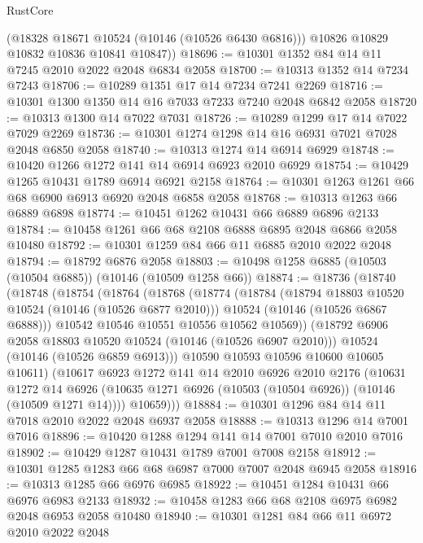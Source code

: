 \begin{lexlean}{RustCore}
\begin{coremodule}
        (@18328 @18671 @10524 (@10146 (@10526 @6430 @6816)))
        @10826
        @10829
        @10832
        @10836
        @10841
        @10847))
@18696 := @10301 @1352 @84 @14 @11 @7245 @2010 @2022 @2048 @6834 @2058
@18700 := @10313 @1352 @14 @7234 @7243
@18706 := @10289 @1351 @17 @14 @7234 @7241 @2269
@18716 := @10301 @1300 @1350 @14 @16 @7033 @7233 @7240 @2048 @6842 @2058
@18720 := @10313 @1300 @14 @7022 @7031
@18726 := @10289 @1299 @17 @14 @7022 @7029 @2269
@18736 := @10301 @1274 @1298 @14 @16 @6931 @7021 @7028 @2048 @6850 @2058
@18740 := @10313 @1274 @14 @6914 @6929
@18748 := @10420 @1266 @1272 @141 @14 @6914 @6923 @2010 @6929
@18754 := @10429 @1265 @10431 @1789 @6914 @6921 @2158
@18764 := @10301 @1263 @1261 @66 @68 @6900 @6913 @6920 @2048 @6858 @2058
@18768 := @10313 @1263 @66 @6889 @6898
@18774 := @10451 @1262 @10431 @66 @6889 @6896 @2133
@18784 := @10458 @1261 @66 @68 @2108 @6888 @6895 @2048 @6866 @2058 @10480
@18792 := @10301 @1259 @84 @66 @11 @6885 @2010 @2022 @2048
@18794 := @18792 @6876 @2058
@18803 := @10498 @1258 @6885 (@10503 (@10504 @6885)) (@10146 (@10509 @1258 @66))
@18874 := @18736
    (@18740
      (@18748
        (@18754
          (@18764
            (@18768
              (@18774
                (@18784
                  (@18794 @18803 @10520 @10524 (@10146 (@10526 @6877 @2010)))
                  @10524
                  (@10146 (@10526 @6867 @6888)))
                @10542
                @10546
                @10551
                @10556
                @10562
                @10569))
            (@18792 @6906 @2058 @18803 @10520 @10524 (@10146 (@10526 @6907 @2010)))
            @10524
            (@10146 (@10526 @6859 @6913)))
          @10590
          @10593
          @10596
          @10600
          @10605
          @10611)
        (@10617
          @6923
          @1272
          @141
          @14
          @2010
          @6926
          @2010
          @2176
          (@10631
            @1272
            @14
            @6926
            (@10635 @1271 @6926 (@10503 (@10504 @6926)) (@10146 (@10509 @1271 @14))))
          @10659)))
@18884 := @10301 @1296 @84 @14 @11 @7018 @2010 @2022 @2048 @6937 @2058
@18888 := @10313 @1296 @14 @7001 @7016
@18896 := @10420 @1288 @1294 @141 @14 @7001 @7010 @2010 @7016
@18902 := @10429 @1287 @10431 @1789 @7001 @7008 @2158
@18912 := @10301 @1285 @1283 @66 @68 @6987 @7000 @7007 @2048 @6945 @2058
@18916 := @10313 @1285 @66 @6976 @6985
@18922 := @10451 @1284 @10431 @66 @6976 @6983 @2133
@18932 := @10458 @1283 @66 @68 @2108 @6975 @6982 @2048 @6953 @2058 @10480
@18940 := @10301 @1281 @84 @66 @11 @6972 @2010 @2022 @2048

\end{coremodule}
\end{lexlean}
